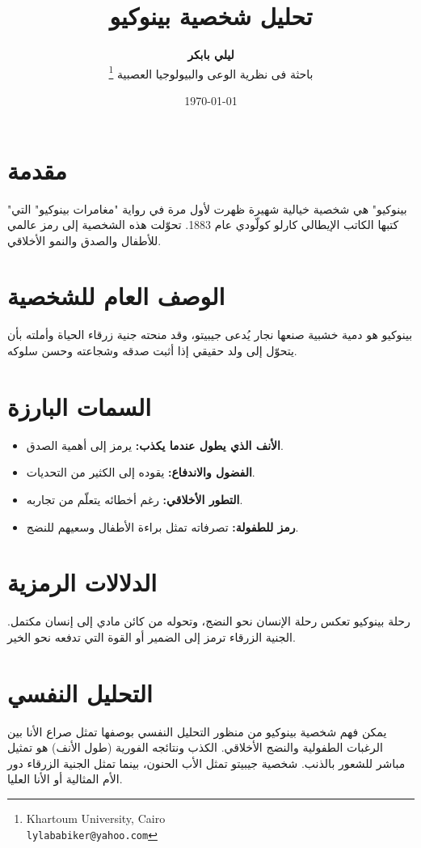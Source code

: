 \documentclass[12pt]{article}
\title{\Huge\bfseries\textcolor{titleColor}{تحليل شخصية بينوكيو }}
\author{\textbf{ليلي بابكر }\\ 
\small باحثة فى نظرية الوعى والبيولوجيا العصبية  
\thanks{\textenglish{Khartoum University, Cairo \\ \texttt{lylababiker@yahoo.com}}}
}
\date{\today}
\begin{document}
\maketitle

\section{مقدمة} \begin{flushright} "بينوكيو" هي شخصية خيالية شهيرة ظهرت لأول مرة في رواية "مغامرات بينوكيو" التي كتبها الكاتب الإيطالي كارلو كولّودي عام 1883. تحوّلت هذه الشخصية إلى رمز عالمي للأطفال والصدق والنمو الأخلاقي. \end{flushright}

\section{الوصف العام للشخصية} \begin{flushright} بينوكيو هو دمية خشبية صنعها نجار يُدعى جيبيتو، وقد منحته جنية زرقاء الحياة وأملته بأن يتحوّل إلى ولد حقيقي إذا أثبت صدقه وشجاعته وحسن سلوكه. \end{flushright}

\section{السمات البارزة} \begin{itemize} \item \textbf{الأنف الذي يطول عندما يكذب:} يرمز إلى أهمية الصدق. \item \textbf{الفضول والاندفاع:} يقوده إلى الكثير من التحديات. \item \textbf{التطور الأخلاقي:} رغم أخطائه يتعلّم من تجاربه. \item \textbf{رمز للطفولة:} تصرفاته تمثل براءة الأطفال وسعيهم للنضج. \end{itemize}

\section{الدلالات الرمزية} \begin{flushright} رحلة بينوكيو تعكس رحلة الإنسان نحو النضج، وتحوله من كائن مادي إلى إنسان مكتمل. الجنية الزرقاء ترمز إلى الضمير أو القوة التي تدفعه نحو الخير. \end{flushright}

\section{التحليل النفسي} \begin{flushright} يمكن فهم شخصية بينوكيو من منظور التحليل النفسي بوصفها تمثل صراع الأنا بين الرغبات الطفولية والنضج الأخلاقي. الكذب ونتائجه الفورية (طول الأنف) هو تمثيل مباشر للشعور بالذنب. شخصية جيبيتو تمثل الأب الحنون، بينما تمثل الجنية الزرقاء دور الأم المثالية أو الأنا العليا. \end{flushright}
\end{document}
